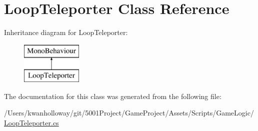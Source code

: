 \hypertarget{class_loop_teleporter}{}\section{Loop\+Teleporter Class Reference}
\label{class_loop_teleporter}
Inheritance diagram for Loop\+Teleporter\+:\begin{figure}[H]
\begin{center}
\leavevmode
\includegraphics[height=2.000000cm]{class_loop_teleporter}
\end{center}
\end{figure}


The documentation for this class was generated from the following file\+:\begin{DoxyCompactItemize}
\item 
/\+Users/kwanholloway/git/5001\+Project/\+Game\+Project/\+Assets/\+Scripts/\+Game\+Logic/\hyperlink{_loop_teleporter_8cs}{Loop\+Teleporter.\+cs}\end{DoxyCompactItemize}
